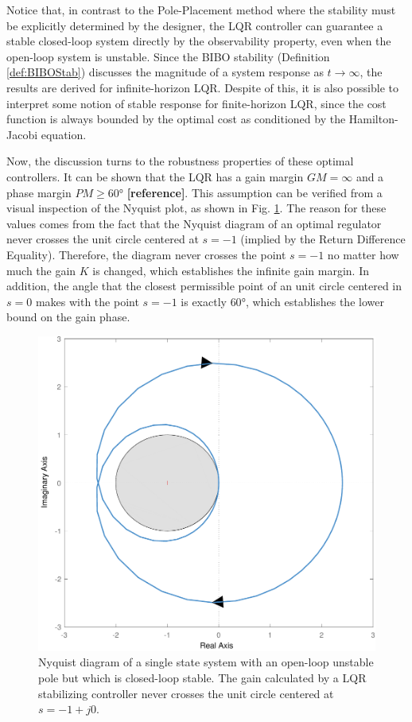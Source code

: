 \documentclass[a4paper,11pt]{book}
\numberwithin{figure}{chapter}
\numberwithin{equation}{chapter}
\numberwithin{table}{chapter}
\theoremstyle{definition}
\begin{document}
Notice that, in contrast to the Pole-Placement method where the stability must be explicitly determined by the designer, the LQR controller can guarantee a stable closed-loop system directly by the observability property, even when the open-loop system is unstable. Since the BIBO stability (Definition \ref{def:BIBOStab}) discusses the magnitude of a system response as $t \to \infty$, the results are derived for infinite-horizon LQR. Despite of this, it is also possible to interpret some notion of stable response for finite-horizon LQR, since the cost function is always bounded by the optimal cost as conditioned by the Hamilton-Jacobi equation.

Now, the discussion turns to the robustness properties of these optimal controllers. It can be shown that the LQR has a gain margin $GM = \infty$ and a phase margin $PM \geq \ang{60}$ \textbf{[reference]}. This assumption can be verified from a visual inspection of the Nyquist plot, as shown in Fig. \ref{fig:lqrProperties01}. The reason for these values comes from the fact that the Nyquist diagram of an optimal regulator never crosses the unit circle centered at $s = -1$ (implied by the Return Difference Equality). Therefore, the diagram never crosses the point $s = -1$ no matter how much the gain $K$ is changed, which establishes the infinite gain margin. In addition, the angle that the closest permissible point of an unit circle centered in $s = 0$ makes with the point $s = -1$ is exactly $\ang{60}$, which establishes the lower bound on the gain phase.

\begin{figure}[ht]
	\centering
	\includegraphics[scale=0.65]{chapter4/report_ch4_2}
	\caption{Nyquist diagram of a single state system with an open-loop unstable pole but which is closed-loop stable. The gain calculated by a LQR stabilizing controller never crosses the unit circle centered at $s = -1 + j0$.}
	\label{fig:lqrProperties01}
\end{figure}
\end{document}
